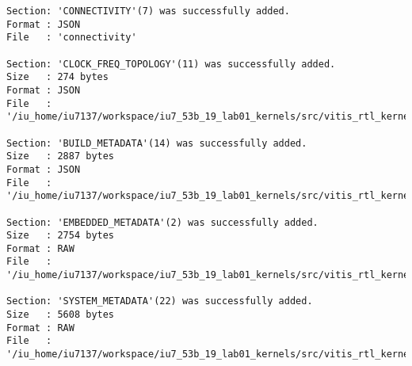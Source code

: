 \begin{center}
\begin{lstlisting}[label=lst:vlog,caption=Файл v++\_vinc.log]
Section: 'CONNECTIVITY'(7) was successfully added.
Format : JSON
File   : 'connectivity'

Section: 'CLOCK_FREQ_TOPOLOGY'(11) was successfully added.
Size   : 274 bytes
Format : JSON
File   : '/iu_home/iu7137/workspace/iu7_53b_19_lab01_kernels/src/vitis_rtl_kernel/rtl_kernel_wizard_1/_x/link/int/vinc_xml.rtd'

Section: 'BUILD_METADATA'(14) was successfully added.
Size   : 2887 bytes
Format : JSON
File   : '/iu_home/iu7137/workspace/iu7_53b_19_lab01_kernels/src/vitis_rtl_kernel/rtl_kernel_wizard_1/_x/link/int/vinc_build.rtd'

Section: 'EMBEDDED_METADATA'(2) was successfully added.
Size   : 2754 bytes
Format : RAW
File   : '/iu_home/iu7137/workspace/iu7_53b_19_lab01_kernels/src/vitis_rtl_kernel/rtl_kernel_wizard_1/_x/link/int/vinc.xml'

Section: 'SYSTEM_METADATA'(22) was successfully added.
Size   : 5608 bytes
Format : RAW
File   : '/iu_home/iu7137/workspace/iu7_53b_19_lab01_kernels/src/vitis_rtl_kernel/rtl_kernel_wizard_1/_x/link/int/systemDiagramModelSlrBaseAddress.json'


\end{lstlisting}
\end{center}
